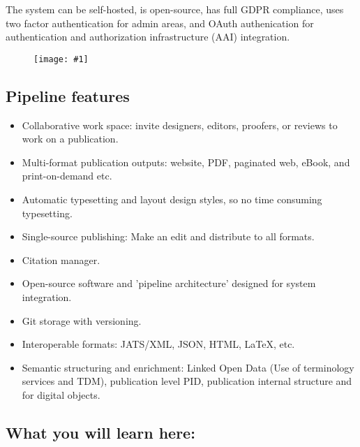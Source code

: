 \documentclass{article}
\newlength{\imgwidth}
\newcommand\scaledgraphics[2]{%
                
\settowidth{\imgwidth}{\texttt{[image: \#1]}}%
                
\setlength{\imgwidth}{\minof{\imgwidth}{#2\textwidth}}%
                
\texttt{[image: \#1]}%
                
}
\begin{document}
The system can be self-hosted, is open-source, has full GDPR compliance, uses two factor authentication for admin areas, and OAuth authenication for authentication and authorization infrastructure (AAI) integration. 

\begin{figure}
\scaledgraphics{60a0cd01-c4e1-467e-a517-a5ae77dbbbaf.png}{0.75}
\label{F45597451}
\end{figure}


\subsection{Pipeline features}\label{H2087393}


\begin{itemize}
\item Collaborative work space: invite designers, editors, proofers, or reviews to work on a publication.


\item Multi-format publication outputs: website, PDF, paginated web, eBook, and print-on-demand etc.


\item Automatic typesetting and layout design styles, so no time consuming typesetting.


\item Single-source publishing: Make an edit and distribute to all formats.


\item Citation manager.


\item Open-source software and 'pipeline architecture' designed for system integration.


\item Git storage with versioning.


\item Interoperable formats: JATS/XML, JSON, HTML, LaTeX, etc.


\item Semantic structuring and enrichment: Linked Open Data (Use of terminology services and TDM), publication level PID, publication internal structure and for digital objects.


\end{itemize}

\subsection{What you will learn here:}\label{H7757657}
\end{document}
